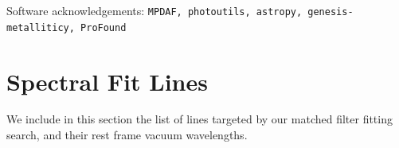 \documentclass[fleqn,usenatbib]{mnras}
\begin{document}
Software acknowledgements: \texttt{MPDAF, photoutils, astropy, genesis-metalliticy, ProFound}


 












\appendix

\section{Spectral Fit Lines}
\label{app:lines}
We include in this section the list of lines targeted by our matched filter fitting search, and their rest frame vacuum wavelengths.
\end{document}
